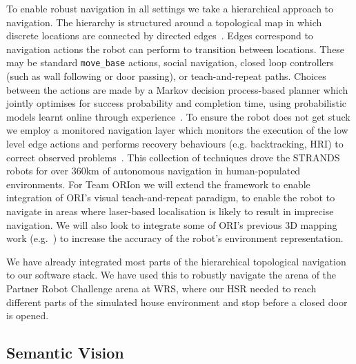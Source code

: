 \documentclass[runningheads,a4paper]{llncs}
\newcommand{\teamori}{Team ORIon}
\begin{document}
To enable robust navigation in all settings we take a hierarchical approach to navigation. The hierarchy is structured around a topological map in which discrete locations are connected by directed edges~\cite{jpulido2015NowOrLater}. Edges correspond to navigation actions the robot can perform to transition between locations. These may be standard \texttt{move\_base} actions, social navigation, closed loop controllers (such as wall following or door passing), or teach-and-repeat paths. Choices between the actions are made by a Markov decision process-based planner which jointly optimises for success probability and completion time, using probabilistic models learnt online through experience~\cite{LPH14b}. To ensure the robot does not get stuck we employ a monitored navigation layer which monitors the execution of the low level edge actions and performs recovery behaviours (e.g. backtracking, HRI) to correct observed problems~\cite{strands@ram}. This collection of techniques drove the STRANDS robots for over 360km of autonomous navigation in human-populated environments. For \teamori{} we will extend the framework to enable integration of ORI's visual teach-and-repeat paradigm, to enable the robot to navigate in areas where laser-based localisation is likely to result in imprecise navigation. We will also look to integrate some of ORI's previous 3D mapping work (e.g.~\cite{AmayoICRA2016}) to increase the accuracy of the robot's environment representation.

We have already integrated most parts of the hierarchical topological navigation
to our software stack. We have used this to robustly navigate the arena of
the Partner Robot Challenge arena at WRS, where our HSR needed to reach
different parts of the simulated house environment and stop before a closed
door is opened. 

\subsection{Semantic Vision}
\end{document}

